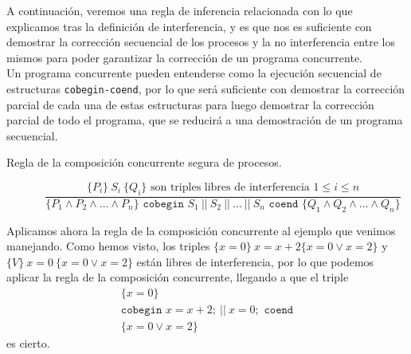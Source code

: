 A continuación, veremos una regla de inferencia relacionada con lo que explicamos tras la definición de interferencia, y es que nos es suficiente con demostrar la corrección secuencial de los procesos y la no interferencia entre los mismos para poder garantizar la corrección de un programa concurrente.\\
Un programa concurrente pueden entenderse como la ejecución secuencial de estructuras \texttt{cobegin-coend}, por lo que será suficiente con demostrar la corrección parcial de cada una de estas estructuras para luego demostrar la corrección parcial de todo el programa, que se reducirá a una demostración de un programa secuencial.

\begin{description}
    \item [Regla de la composición concurrente segura de procesos.] 
        \begin{equation*}
            \dfrac{\{P_i\}\ S_i\ \{Q_i\} \text{\ son\ triples\ libres\ de\ interferencia\ } 1\leq i \leq n}{\{P_1 \land P_2 \land \ldots \land P_n\} \texttt{\ cobegin\ } S_1\ ||\ S_2\ ||\ \ldots\ ||\ S_n \texttt{\ coend\ } \{Q_1 \land Q_2 \land \ldots \land Q_n\}}
        \end{equation*}
\end{description}

\begin{ejemplo}
    Aplicamos ahora la regla de la composición concurrente al ejemplo que venimos manejando. Como hemos visto, los triples $\{x=0\}\ x=x+2\{x=0 \lor x=2\}$ y $\{V\}\ x=0\ \{x=0 \lor x=2\}$ están libres de interferencia, por lo que podemos aplicar la regla de la composición concurrente, llegando a que el triple
    \begin{gather*}
        \{x=0\} \\
        \texttt{cobegin } x=x+2;\ ||\ x=0; \texttt{ coend} \\
        \{x=0 \lor x=2\}
    \end{gather*}
    es cierto.
\end{ejemplo}

